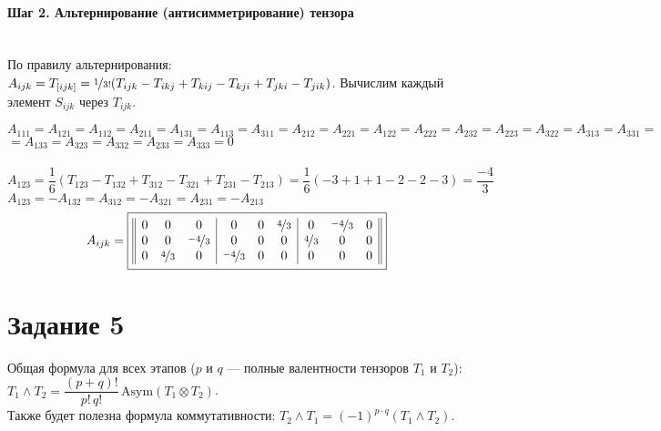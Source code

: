 \documentclass{article}
\newcommand*\squared[1]{\tikz[baseline=(char.base)]{
            \node[shape=rectangle,draw,inner sep=4pt] (char) {#1};}}
\begin{document}
\paragraph*{Шаг 2. Альтернирование (антисимметрирование) тензора} \, \\
По правилу альтернирования: $A_{ijk} = T_{[ijk]} = \nicefrac{1}{3!}(T_{ijk} - T_{ikj} + T_{kij} - T_{kji} + T_{jki} - T_{jik})$. Вычислим каждый элемент $S_{ijk}$ через $T_{ijk}$.
\begin{center}
$A_{111} = A_{121} = A_{112} = A_{211} = A_{131} = A_{113} = A_{311} = A_{212} = A_{221} = A_{122} = A_{222} = A_{232} = A_{223} = A_{322} = A_{313} = A_{331} =$ \\
$= A_{133} = A_{323} = A_{332} = A_{233} = A_{333} = 0$ \\ \, \\
$A_{123} = \dfrac{1}{6}\left(T_{123} - T_{132} + T_{312} - T_{321} + T_{231} - T_{213}\right) = \dfrac{1}{6}(-3 +1 +1 - 2 -2 - 3) = \dfrac{-4}{3}$ \\
$A_{123} = -A_{132} = A_{312} = -A_{321} = A_{231} = -A_{213}$\\
$$A_{ijk} = \squared{$\begin{array}{||ccc|ccc|ccc||}
0 & 0 &	0 &	0 &	0 &	\nicefrac{4}{3} &	0 &	\nicefrac{-4}{3} &	0 \\
0 & 0 &	\nicefrac{-4}{3} &	0 &	0 &	0 &	\nicefrac{4}{3} &	0 &	0 \\
0 & \nicefrac{4}{3} &	0 &	\nicefrac{-4}{3} &	0 &	0 &	0 &	0 &	0 \\
\end{array}$}$$
\end{center}

\pagebreak
\section*{Задание 5}
Общая формула для всех этапов ($p$ и $q$ --- полные валентности тензоров $T_1$ и $T_2$): $T_1\wedge T_2 = \dfrac{(p+q)!}{p!\,q!}\,\text{Asym}(T_1\otimes T_2)$. \\
Также будет полезна формула коммутативности: $T_2\wedge T_1 = (-1)^{p\cdot q}(T_1\wedge T_2)$.
\end{document}
